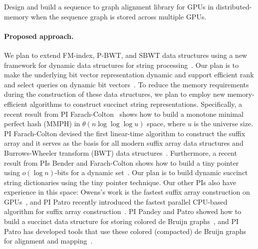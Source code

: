 \begin{rproblem}
Design and build a sequence to graph alignment library for GPUs in distributed-memory when the sequence graph is stored across multiple GPUs.
\end{rproblem}

\paragraph{Proposed approach.}

We plan to extend FM-index, P-BWT, and SBWT data structures using a new framework for dynamic data structures for string processing~\cite{Nicola17,Farzan2011}. Our plan is to make the underlying bit vector representation dynamic and support efficient rank and select queries on dynamic bit vectors~\cite{Raman2001}.
To reduce the memory requirements during the construction of these data structures, we plan to employ new memory-efficient algorithms to construct succinct string representations. Specifically, a recent result from PI Farach-Colton~\cite{Assadi2023} shows how to build a monotone minimal perfect hash (MMPH) in $\theta(n \log{\log{\log u}})$ space, where $u$ is the universe size.
%
PI Farach-Colton devised the first linear-time algorithm to construct the suffix array and it serves as the basis for all modern suffix array data structures and Burrows-Wheeler transform (BWT) data structures~\cite{Farach97,Ambainis97}. Furthermore, a recent result from PIs Bender and Farach-Colton shows how to build a tiny pointer using $o(\log{n})$-bits for a dynamic set~\cite{Bender2023}. Our plan is to build dynamic succinct string dictionaries using the tiny pointer technique. Our other PIs also have experience in this space:
Owens's work is the fastest suffix array construction on GPUs~\cite{Wang:2016:FPS}, and PI Patro recently introduced the fastest parallel CPU-based algorithm for suffix array construction~\cite{Khan2023CapsSA}. PI Pandey and Patro showed how to build a succinct data structure for storing colored de Bruijn graphs~\cite{almodaresi2017rainbowfish}, and PI Patro has developed tools that use these colored (compacted) de Bruijn graphs for alignment and mapping~\cite{Almodaresi2018Pufferfish,Almodaresi2021,fan2023fulgor,Pibiri2023MacDBG,he2022alevin}.